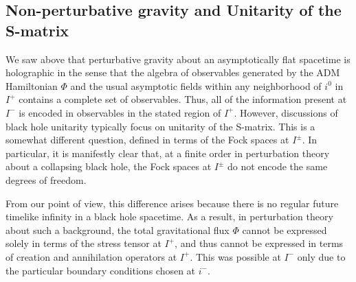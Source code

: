 \documentclass[12pt,onecolumn,eqsecnum,aps,prd,nofootinbib]{revtex4}
\begin{document}
\subsection{Non-perturbative gravity and Unitarity of the S-matrix}
\label{nonpert}

We saw above that perturbative gravity about an asymptotically flat spacetime
is holographic in the sense that the algebra of observables generated by the ADM Hamiltonian $\Phi$ and the usual asymptotic fields within any neighborhood of $i^0$ in $I^+$ contains a
complete set of observables. Thus, all of the information present at
$I^-$ is encoded in observables in the stated region of $I^+$.   However,
discussions of black hole unitarity typically focus on unitarity of
the S-matrix. This is a somewhat different question, defined in
terms of the Fock spaces at $I^\pm.$ In particular, it is manifestly
clear that, at a finite order in perturbation theory about a
collapsing black hole, the Fock spaces at $I^\pm$ do not encode the
same degrees of freedom.

From our point of view, this difference arises because there is no
regular future timelike infinity in a black hole spacetime.  As a
result, in perturbation theory about such a background, the total
gravitational flux $\Phi$ cannot be expressed solely in terms of the
stress tensor at $I^+$, and thus cannot be expressed in terms of
creation and annihilation operators at $I^+$.  This was possible at
$I^-$ only due to the particular boundary conditions chosen at
$i^-$.
\end{document}
